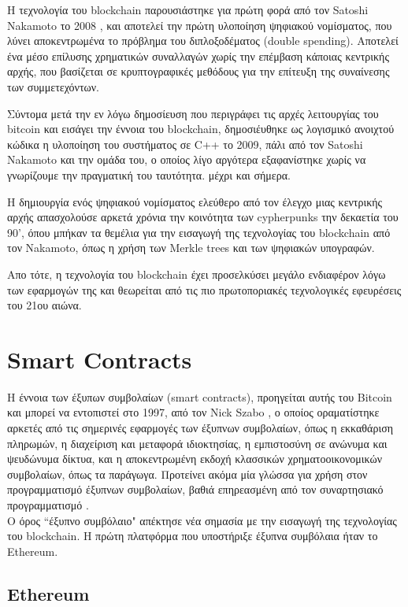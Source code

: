 
Η τεχνολογία του blockchain παρουσιάστηκε για πρώτη φορά από τον Satoshi
Nakamoto το 2008 \cite{bitcoin}, και αποτελεί την πρώτη υλοποίηση ψηφιακού
νομίσματος, που λύνει αποκεντρωμένα το πρόβλημα του διπλοξοδέματος (double
spending).  Αποτελεί ένα μέσο επίλυσης χρηματικών συναλλαγών χωρίς την επέμβαση
κάποιας κεντρικής αρχής, που βασίζεται σε κρυπτογραφικές μεθόδους για την
επίτευξη της συναίνεσης των συμμετεχόντων.

Σύντομα μετά την εν λόγω δημοσίευση που περιγράφει τις αρχές λειτουργίας του
bitcoin και εισάγει την έννοια του blockchain, δημοσιέυθηκε ως λογισμικό
ανοιχτού κώδικα η υλοποίηση του συστήματος σε C++ το 2009, πάλι από τον Satoshi
Nakamoto και την ομάδα του, ο οποίος λίγο αργότερα εξαφανίστηκε χωρίς να
γνωρίζουμε την πραγματική του ταυτότητα. μέχρι και σήμερα.


Η δημιουργία ενός ψηφιακού νομίσματος ελεύθερο από τον έλεγχο μιας κεντρικής
αρχής απασχολούσε αρκετά χρόνια την κοινότητα των cypherpunks την δεκαετία του
90', όπου μπήκαν τα θεμέλια για την εισαγωγή της τεχνολογίας του blockchain από
τον Nakamoto, όπως η χρήση των Merkle trees και των ψηφιακών υπογραφών.

Απο τότε, η τεχνολογία του blockchain έχει προσελκύσει μεγάλο ενδιαφέρον λόγω
των εφαρμογών της και θεωρείται από τις πιο πρωτοποριακές τεχνολογικές
εφευρέσεις του 21ου αιώνα.


\section{ Smart Contracts}

Η έννοια των έξυπων συμβολαίων (smart contracts), προηγείται αυτής του Bitcoin
και μπορεί να εντοπιστεί στο 1997, από τον Nick Szabo \cite{szabo1}, ο οποίος
οραματίστηκε αρκετές από τις σημερινές εφαρμογές των έξυπνων συμβολαίων, όπως η
εκκαθάριση πληρωμών, η διαχείριση και μεταφορά ιδιοκτησίας,  η εμπιστοσύνη σε
ανώνυμα και ψευδώνυμα δίκτυα, και η αποκεντρωμένη εκδοχή κλασσικών
χρηματοοικονομικών συμβολαίων, όπως τα παράγωγα. Προτείνει ακόμα μία γλώσσα για
χρήση στον προγραμματισμό έξυπνων συμβολαίων, βαθιά επηρεασμένη από τον
συναρτησιακό προγραμματισμό \cite{szabosmartcontract}.  \\ Ο όρος ``έξυπνο
συμβόλαιο" απέκτησε νέα σημασία με την εισαγωγή της τεχνολογίας του blockchain.
Η πρώτη πλατφόρμα που υποστήριξε έξυπνα συμβόλαια ήταν το Ethereum.

\subsection{Ethereum}

